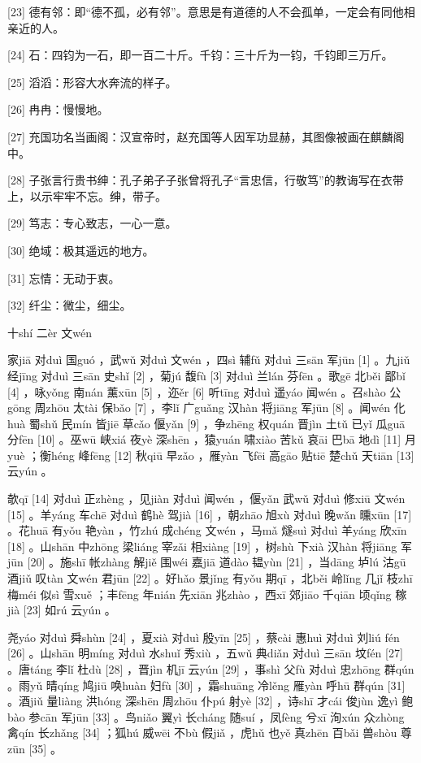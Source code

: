 \documentclass[12pt,UTF8]{ctexbook}
\begin{document}
[23] 德有邻：即“德不孤，必有邻”。意思是有道德的人不会孤单，一定会有同他相亲近的人。

[24] 石：四钧为一石，即一百二十斤。千钧：三十斤为一钧，千钧即三万斤。

[25] 滔滔：形容大水奔流的样子。

[26] 冉冉：慢慢地。

[27] 充国功名当画阁：汉宣帝时，赵充国等人因军功显赫，其图像被画在麒麟阁中。

[28] 子张言行贵书绅：孔子弟子子张曾将孔子“言忠信，行敬笃”的教诲写在衣带上，以示牢牢不忘。绅，带子。

[29] 笃志：专心致志，一心一意。

[30] 绝域：极其遥远的地方。

[31] 忘情：无动于衷。

[32] 纤尘：微尘，细尘。





十shí 二èr 文wén


家jiā 对duì 国guó ，武wǔ 对duì 文wén ，四sì 辅fǔ 对duì 三sān 军jūn [1] 。九jiǔ 经jīng 对duì 三sān 史shǐ [2] ，菊jú 馥fù [3] 对duì 兰lán 芬fēn 。歌gē 北běi 鄙bǐ [4] ，咏yǒng 南nán 薰xūn [5] ，迩ěr [6] 听tīng 对duì 遥yáo 闻wén 。召shào 公gōng 周zhōu 太tài 保bǎo [7] ，李lǐ 广guǎng 汉hàn 将jiāng 军jūn [8] 。闻wén 化huà 蜀shǔ 民mín 皆jiē 草cǎo 偃yǎn [9] ，争zhēng 权quán 晋jìn 土tǔ 已yǐ 瓜guā 分fēn [10] 。巫wū 峡xiá 夜yè 深shēn ，猿yuán 啸xiào 苦kǔ 哀āi 巴bā 地dì [11] 月yuè ；衡héng 峰fēng [12] 秋qiū 早zǎo ，雁yàn 飞fēi 高gāo 贴tiē 楚chǔ 天tiān [13] 云yún 。

欹qī [14] 对duì 正zhèng ，见jiàn 对duì 闻wén ，偃yǎn 武wǔ 对duì 修xiū 文wén [15] 。羊yáng 车chē 对duì 鹤hè 驾jià [16] ，朝zhāo 旭xù 对duì 晚wǎn 曛xūn [17] 。花huā 有yǒu 艳yàn ，竹zhú 成chéng 文wén ，马mǎ 燧suì 对duì 羊yáng 欣xīn [18] 。山shān 中zhōng 梁liáng 宰zǎi 相xiàng [19] ，树shù 下xià 汉hàn 将jiāng 军jūn [20] 。施shī 帐zhàng 解jiě 围wéi 嘉jiā 道dào 韫yùn [21] ，当dāng 垆lú 沽gū 酒jiǔ 叹tàn 文wén 君jūn [22] 。好hǎo 景jǐng 有yǒu 期qī ，北běi 岭lǐng 几jǐ 枝zhī 梅méi 似sì 雪xuě ；丰fēng 年nián 先xiān 兆zhào ，西xī 郊jiāo 千qiān 顷qǐng 稼jià [23] 如rú 云yún 。

尧yáo 对duì 舜shùn [24] ，夏xià 对duì 殷yīn [25] ，蔡cài 惠huì 对duì 刘liú fén [26] 。山shān 明míng 对duì 水shuǐ 秀xiù ，五wǔ 典diǎn 对duì 三sān 坟fén [27] 。唐táng 李lǐ 杜dù [28] ，晋jìn 机jī 云yún [29] ，事shì 父fù 对duì 忠zhōng 群qún 。雨yǔ 晴qíng 鸠jiū 唤huàn 妇fù [30] ，霜shuāng 冷lěng 雁yàn 呼hū 群qún [31] 。酒jiǔ 量liàng 洪hóng 深shēn 周zhōu 仆pú 射yè [32] ，诗shī 才cái 俊jùn 逸yì 鲍bào 参cān 军jūn [33] 。鸟niǎo 翼yì 长cháng 随suí ，凤fèng 兮xī 洵xún 众zhòng 禽qín 长zhǎng [34] ；狐hú 威wēi 不bù 假jiǎ ，虎hǔ 也yě 真zhēn 百bǎi 兽shòu 尊zūn [35] 。
\end{document}
